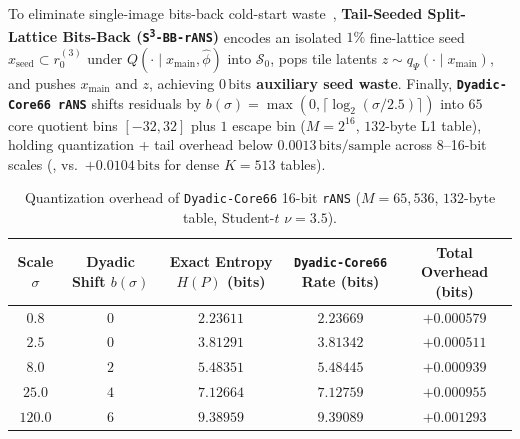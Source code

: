 To eliminate single-image bits-back cold-start waste~\citep{townsend2019bbans,kingma2019bitswap}, \textbf{Tail-Seeded Split-Lattice Bits-Back (\texttt{S\textsuperscript{3}-BB-rANS})} encodes an isolated $1\%$ fine-lattice seed $x_{\mathrm{seed}} \subset r_0^{(3)}$ under $Q(\cdot\mid x_{\mathrm{main}},\hat{\phi})$ into $\mathcal{S}_0$, pops tile latents $z \sim q_\Psi(\cdot\mid x_{\mathrm{main}})$, and pushes $x_{\mathrm{main}}$ and $z$, achieving \textbf{$0\,\mathrm{bits}$ auxiliary seed waste}. Finally, \textbf{\texttt{Dyadic-Core66 rANS}} shifts residuals by $b(\sigma) = \max(0, \lceil \log_2(\sigma/2.5)\rceil)$ into $65$ core quotient bins $[-32,32]$ plus $1$ escape bin ($M=2^{16}$, $132$-byte L1 table), holding quantization + tail overhead below $0.0013\,\mathrm{bits/sample}$ across 8--16-bit scales (, vs.\ $+0.0104\,\mathrm{bits}$ for dense $K=513$ tables).

\begin{table}[htbp]
\centering
\caption{Quantization overhead of \texttt{Dyadic-Core66} 16-bit \texttt{rANS} ($M=65{,}536$, $132$-byte table, Student-$t$ $\nu=3.5$).}
\label{tab:rans-audit}
\footnotesize
\begin{tabular}{@{}ccccc@{}}
\toprule
\textbf{Scale $\sigma$} & \textbf{Dyadic Shift $b(\sigma)$} & \textbf{Exact Entropy $H(P)$ (bits)} & \textbf{\texttt{Dyadic-Core66} Rate (bits)} & \textbf{Total Overhead (bits)} \\
\midrule
$0.8$ & $0$ & $2.23611$ & $2.23669$ & $+0.000579$ \\
$2.5$ & $0$ & $3.81291$ & $3.81342$ & $+0.000511$ \\
$8.0$ & $2$ & $5.48351$ & $5.48445$ & $+0.000939$ \\
$25.0$ & $4$ & $7.12664$ & $7.12759$ & $+0.000955$ \\
$120.0$ & $6$ & $9.38959$ & $9.39089$ & $+0.001293$ \\
\bottomrule
\end{tabular}
\end{table}
